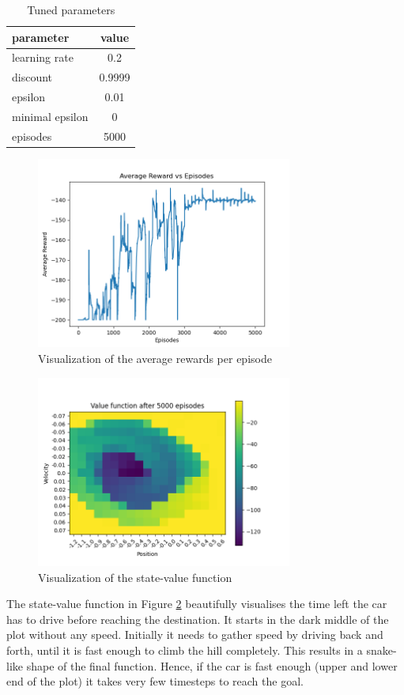 \documentclass{article}
\begin{document}
\begin{table}[!h]
    \centering
    \begin{tabular}{l|c}
        parameter & value \\
        \hline
        learning rate & 0.2 \\
        discount & 0.9999 \\
        epsilon & 0.01 \\
        minimal epsilon & 0 \\
        episodes & 5000 \\
    \end{tabular}
    \caption{Tuned parameters}
    \label{tab:tuned_params}
\end{table}

\begin{figure}
    \centering
    \includegraphics[width=0.75\textwidth]{rewards.png}
    \caption{Visualization of the average rewards per episode}
    \label{fig:average_rewards}
\end{figure}

\begin{figure}
    \centering
    \includegraphics[width=0.75\textwidth]{state-value-function.png}
    \caption{Visualization of the state-value function}
    \label{fig:state-value-function}
\end{figure}

The state-value function in Figure \ref{fig:state-value-function} beautifully visualises the time left the car has to drive before reaching the destination. It starts in the dark middle of the plot without any speed. Initially it needs to gather speed by driving back and forth, until it is fast enough to climb the hill completely. This results in a snake-like shape of the final function. Hence, if the car is fast enough (upper and lower end of the plot) it takes very few timesteps to reach the goal.
\end{document}
